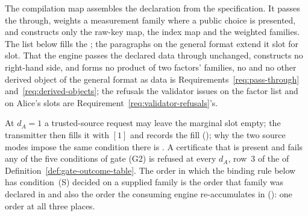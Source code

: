 
The compilation map assembles the declaration from the specification. It
passes the  through, weights a measurement family where a public
choice is presented, and constructs only the raw-key map, the index map and
the weighted families. The list below fills the ; the
paragraphs on the general format extend it slot for slot. That the engine
passes the declared data through unchanged, constructs no right-hand side, and
forms no product of two factors' families, no  and no
other derived object of the general format as data is
Requirements~\ref{req:pass-through} and~\ref{req:derived-objects}; the
refusals the validator issues on the factor list and on Alice's slots are
Requirement~\ref{req:validator-refusals}'s.

At $d_A=1$ a trusted-source request may leave the marginal slot empty; the
transmitter then fills it with $[1]$ and records the fill
(); why the two
source modes impose the same condition there is . A
certificate that is present and fails any of the five conditions of gate (G2)
is refused at every $d_A$, row~3 of the  of
Definition~\ref{def:gate-outcome-table}. The order in which the binding rule below has
condition~(S) decided on a supplied family is the order that family was
declared in and also the order the consuming engine re-accumulates in (): one order
at all three places.

